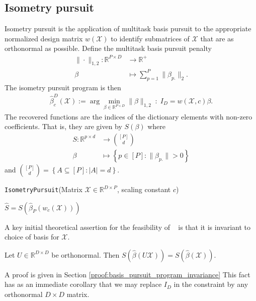\subsection{Isometry pursuit}

Isometry pursuit is the application of multitask basis pursuit to the appropriate normalized design matrix $w(\mathcal X)$ to identify submatrices of $\mathcal X$ that are as orthonormal as possible.
Define the multitask basis pursuit penalty 
\begin{align}
\label{eq:bp}
\| \cdot \|_{1,2}: \mathbb R^{P \times D} &\to \mathbb R^+ \\ 
\beta &\mapsto  \sum_{p=1}^P  \|\beta_{p.}\|_2.
\end{align}
The isometry pursuit program is then
\begin{align}
\label{prog:isometry_pursuit}
\widehat \beta^{D}_c (\mathcal X)  := \arg \min_{\beta \in \mathbb R^{P \times D}} \| \beta \|_{1,2} \; : \; I_D = w ({ \mathcal X}, c) \beta.
\end{align}
The recovered functions are the indices of the dictionary elements with non-zero coefficients.
That is, they are given by $S(\beta)$ where 
\begin{align}
S: \mathbb{R}^{p \times d} &\to \binom{[P]}{d} \\
\beta &\mapsto \left\{ p \in [P] :  \|\beta_{p.}\| > 0 \right\}
\end{align}
and $\binom{[P]}{d} = \left\{ A \subseteq [P] : \left|A\right| = d \right\}$. 
\begin{algorithm}[H]
\caption{\texttt{IsometryPursuit}(Matrix $\mathcal{X} \in \mathbb{R}^{D \times P}$, scaling constant $c$)}
\begin{algorithmic}[1]
 $\widehat{S} = S (\widehat{\beta}_P(w_c(\mathcal{X})))$
\end{algorithmic}
\end{algorithm}

A key initial theoretical assertion for the feasibility of \isometrypursuit~ is that it is invariant to choice of basis for $\mathcal X$.
\begin{proposition}
\label{prop:basis_pursuit_selection_invariance}
Let $U \in \mathbb R^{D \times D}$ be orthonormal.
 Then $S(\widehat \beta  (U \mathcal X)) = S(\widehat \beta (\mathcal X))$.
\end{proposition}
A proof is given in Section \ref{proof:basis_pursuit_program_invariance}
This fact has as an immediate corollary that we may replace $I_D$ in the constraint by any orthonormal $D \times D$ matrix.

